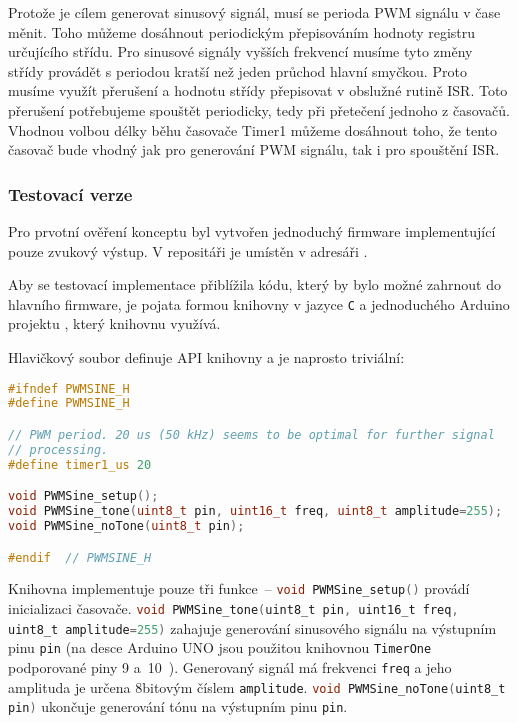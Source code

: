 Protože je cílem generovat sinusový signál, musí se perioda PWM signálu v čase
měnit. Toho můžeme dosáhnout periodickým přepisováním hodnoty registru
určujícího střídu. Pro sinusové signály vyšších frekvencí musíme tyto změny
střídy provádět s periodou kratší než jeden průchod hlavní smyčkou. Proto
musíme využít přerušení a hodnotu střídy přepisovat v obslužné rutině ISR.
Toto přerušení potřebujeme spouštět periodicky, tedy při přetečení jednoho
z časovačů. Vhodnou volbou délky běhu časovače Timer1 můžeme dosáhnout toho, že
tento časovač bude vhodný jak pro generování PWM signálu, tak i pro spouštění
ISR.

\subsubsection{Testovací verze}
Pro prvotní ověření konceptu byl vytvořen jednoduchý firmware implementující
pouze zvukový výstup. V repositáři  je umístěn v adresáři
.  %

Aby se testovací implementace přiblížila kódu, který by bylo možné zahrnout do
hlavního firmware, je pojata formou knihovny v jazyce \texttt{C} a jednoduchého
Arduino projektu , který knihovnu využívá.

Hlavičkový soubor  definuje API knihovny a je naprosto
triviální:
\begin{lstlisting}[language=C++,style=numbers]
#ifndef PWMSINE_H
#define PWMSINE_H

// PWM period. 20 us (50 kHz) seems to be optimal for further signal
// processing.
#define timer1_us 20

void PWMSine_setup();
void PWMSine_tone(uint8_t pin, uint16_t freq, uint8_t amplitude=255);
void PWMSine_noTone(uint8_t pin);

#endif  // PWMSINE_H
\end{lstlisting}

Knihovna implementuje pouze tři funkce~--
\lstinline[language=C]!void PWMSine_setup()! provádí inicializaci časovače.
\lstinline[language=C]!void PWMSine_tone(uint8_t pin, uint16_t freq, uint8_t amplitude=255)!
zahajuje generování sinusového signálu na výstupním pinu \texttt{pin} (na desce
Arduino UNO jsou použitou knihovnou \texttt{TimerOne} podporované piny 9
a~10~\cite{TimerOnedocs}). Generovaný signál má frekvenci \texttt{freq} a jeho
amplituda je určena 8bitovým číslem \texttt{amplitude}.
\lstinline[language=C]!void PWMSine_noTone(uint8_t pin)! ukončuje generování
tónu na výstupním pinu \texttt{pin}.

